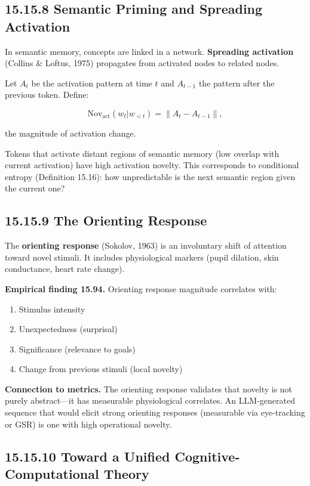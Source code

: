 \subsection{15.15.8 Semantic Priming and Spreading Activation}

In semantic memory, concepts are linked in a network. \textbf{Spreading activation} (Collins \& Loftus, 1975) propagates from activated nodes to related nodes.

\begin{definition}
Let $A_t$ be the activation pattern at time $t$ and $A_{t-1}$ the pattern after the previous token. Define:

\[\mathrm{Nov}_{\mathrm{act}}(w_t | w_{<t}) = \| A_t - A_{t-1} \|,\]

the magnitude of activation change.

Tokens that activate distant regions of semantic memory (low overlap with current activation) have high activation novelty. This corresponds to conditional entropy (Definition 15.16): how unpredictable is the next semantic region given the current one?
\end{definition}

\subsection{15.15.9 The Orienting Response}

The \textbf{orienting response} (Sokolov, 1963) is an involuntary shift of attention toward novel stimuli. It includes physiological markers (pupil dilation, skin conductance, heart rate change).

\textbf{Empirical finding 15.94.} Orienting response magnitude correlates with:
\begin{enumerate}
\item Stimulus intensity
\item Unexpectedness (surprisal)
\item Significance (relevance to goals)
\item Change from previous stimuli (local novelty)
\end{enumerate}

\textbf{Connection to metrics.} The orienting response validates that novelty is not purely abstract---it has measurable physiological correlates. An LLM-generated sequence that would elicit strong orienting responses (measurable via eye-tracking or GSR) is one with high operational novelty.

\subsection{15.15.10 Toward a Unified Cognitive-Computational Theory}

